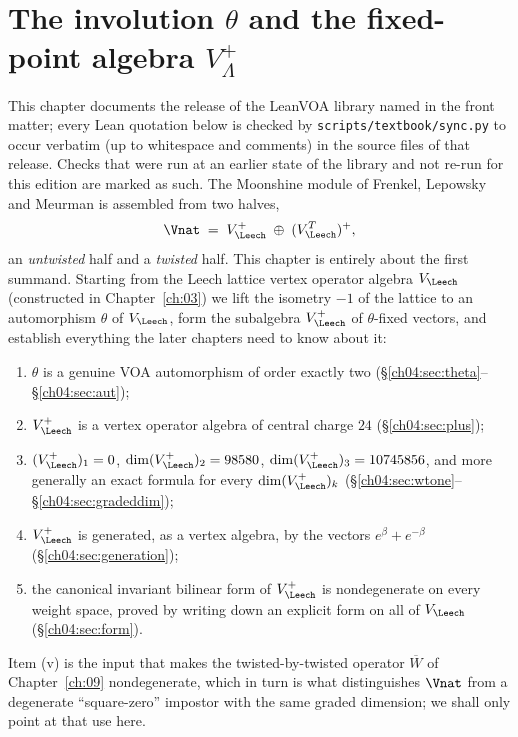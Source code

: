 \chapter{The involution \texorpdfstring{$\theta$}{theta} and the fixed-point algebra \texorpdfstring{$V_\Lambda^+$}{V+}}\label{ch:04}

\providecommand{\chfourone}{\mathbf{1}}

This chapter documents the release of the LeanVOA library named in the front matter; every Lean quotation below is checked by \texttt{scripts/textbook/sync.py}
to occur verbatim (up to whitespace and comments) in the source files of that release. Checks
that were run at an earlier state of the library and not re-run for this edition are marked as such.
The Moonshine module of Frenkel, Lepowsky and Meurman is assembled from two halves,
\begin{equation*}
  \Vnat \;=\; V_\Leech^{+}\;\oplus\;(V_\Leech^{T})^{+},
\end{equation*}
an \emph{untwisted} half and a \emph{twisted} half. This chapter is entirely about the first
summand. Starting from the Leech lattice vertex operator algebra $V_\Leech$ (constructed in
Chapter~\ref{ch:03}) we lift the isometry $-1$ of the lattice to an automorphism $\theta$ of
$V_\Leech$, form the subalgebra $V_\Leech^+$ of $\theta$-fixed vectors, and establish everything the
later chapters need to know about it:
\begin{enumerate}[label=(\roman*)]
\item $\theta$ is a genuine VOA automorphism of order exactly two
  (\S\ref{ch04:sec:theta}--\S\ref{ch04:sec:aut});
\item $V_\Leech^+$ is a vertex operator algebra of central charge $24$ (\S\ref{ch04:sec:plus});
\item $(V_\Leech^+)_1 = 0$, $\dim (V_\Leech^+)_2 = 98580$, $\dim (V_\Leech^+)_3 = 10745856$, and
  more generally an exact formula for every $\dim(V_\Leech^+)_k$
  (\S\ref{ch04:sec:wtone}--\S\ref{ch04:sec:gradeddim});
\item $V_\Leech^+$ is generated, as a vertex algebra, by the vectors $e^\beta+e^{-\beta}$
  (\S\ref{ch04:sec:generation});
\item the canonical invariant bilinear form of $V_\Leech^+$ is nondegenerate on every weight space,
  proved by writing down an explicit form on all of $V_\Leech$ (\S\ref{ch04:sec:form}).
\end{enumerate}
Item (v) is the input that makes the twisted-by-twisted operator $\overline W$ of
Chapter~\ref{ch:09} nondegenerate, which in turn is what distinguishes $\Vnat$ from a degenerate
``square-zero'' impostor with the same graded dimension; we shall only point at that use here.

